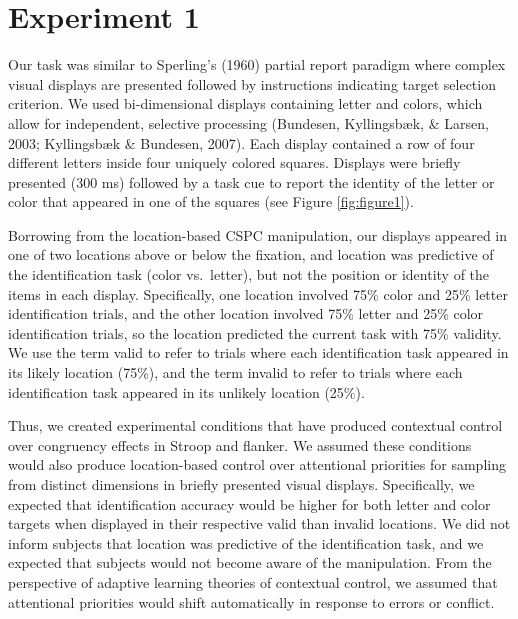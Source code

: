 \documentclass[english,,man,floatsintext]{apa6}
\begin{document}
\section{Experiment 1}\label{experiment-1}

Our task was similar to Sperling's (1960) partial report paradigm where
complex visual displays are presented followed by instructions
indicating target selection criterion. We used bi-dimensional displays
containing letter and colors, which allow for independent, selective
processing (Bundesen, Kyllingsbæk, \& Larsen, 2003; Kyllingsbæk \&
Bundesen, 2007). Each display contained a row of four different letters
inside four uniquely colored squares. Displays were briefly presented
(300 ms) followed by a task cue to report the identity of the letter or
color that appeared in one of the squares (see Figure
\ref{fig:figure1}).

Borrowing from the location-based CSPC manipulation, our displays
appeared in one of two locations above or below the fixation, and
location was predictive of the identification task (color vs.~letter),
but not the position or identity of the items in each display.
Specifically, one location involved 75\% color and 25\% letter
identification trials, and the other location involved 75\% letter and
25\% color identification trials, so the location predicted the current
task with 75\% validity. We use the term valid to refer to trials where
each identification task appeared in its likely location (75\%), and the
term invalid to refer to trials where each identification task appeared
in its unlikely location (25\%).

Thus, we created experimental conditions that have produced contextual
control over congruency effects in Stroop and flanker. We assumed these
conditions would also produce location-based control over attentional
priorities for sampling from distinct dimensions in briefly presented
visual displays. Specifically, we expected that identification accuracy
would be higher for both letter and color targets when displayed in
their respective valid than invalid locations. We did not inform
subjects that location was predictive of the identification task, and we
expected that subjects would not become aware of the manipulation. From
the perspective of adaptive learning theories of contextual control, we
assumed that attentional priorities would shift automatically in
response to errors or conflict.
\end{document}
